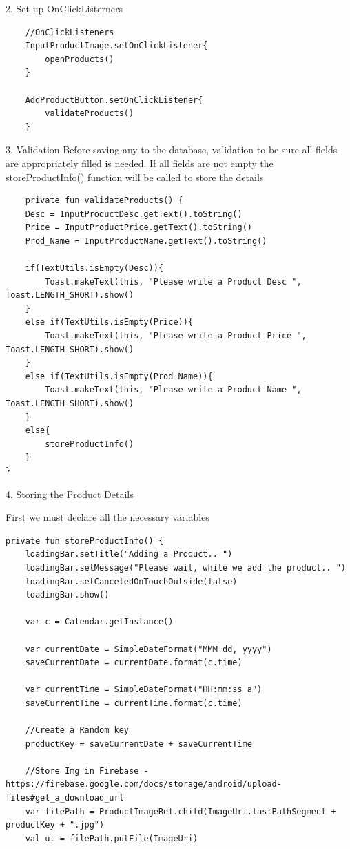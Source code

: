 2. Set up OnClickListerners
\begin{verbatim}
    //OnClickListeners
    InputProductImage.setOnClickListener{
        openProducts()
    }

    AddProductButton.setOnClickListener{
        validateProducts()
    }
\end{verbatim}

3. Validation
Before saving any to the database, validation to be sure all fields are appropriately filled is needed. If all fields are not empty the storeProductInfo() function will be called to store the details
\begin{verbatim}
    private fun validateProducts() {
    Desc = InputProductDesc.getText().toString()
    Price = InputProductPrice.getText().toString()
    Prod_Name = InputProductName.getText().toString()

    if(TextUtils.isEmpty(Desc)){
        Toast.makeText(this, "Please write a Product Desc ", Toast.LENGTH_SHORT).show()
    }
    else if(TextUtils.isEmpty(Price)){
        Toast.makeText(this, "Please write a Product Price ", Toast.LENGTH_SHORT).show()
    }
    else if(TextUtils.isEmpty(Prod_Name)){
        Toast.makeText(this, "Please write a Product Name ", Toast.LENGTH_SHORT).show()
    }
    else{
        storeProductInfo()
    }
}
\end{verbatim}

4. Storing the Product Details

First we must declare all the necessary variables

\begin{verbatim}
private fun storeProductInfo() {
    loadingBar.setTitle("Adding a Product.. ")
    loadingBar.setMessage("Please wait, while we add the product.. ")
    loadingBar.setCanceledOnTouchOutside(false)
    loadingBar.show()

    var c = Calendar.getInstance()

    var currentDate = SimpleDateFormat("MMM dd, yyyy")
    saveCurrentDate = currentDate.format(c.time)

    var currentTime = SimpleDateFormat("HH:mm:ss a")
    saveCurrentTime = currentTime.format(c.time)

    //Create a Random key
    productKey = saveCurrentDate + saveCurrentTime

    //Store Img in Firebase - https://firebase.google.com/docs/storage/android/upload-files#get_a_download_url
    var filePath = ProductImageRef.child(ImageUri.lastPathSegment + productKey + ".jpg")
    val ut = filePath.putFile(ImageUri)
    
\end{verbatim}

